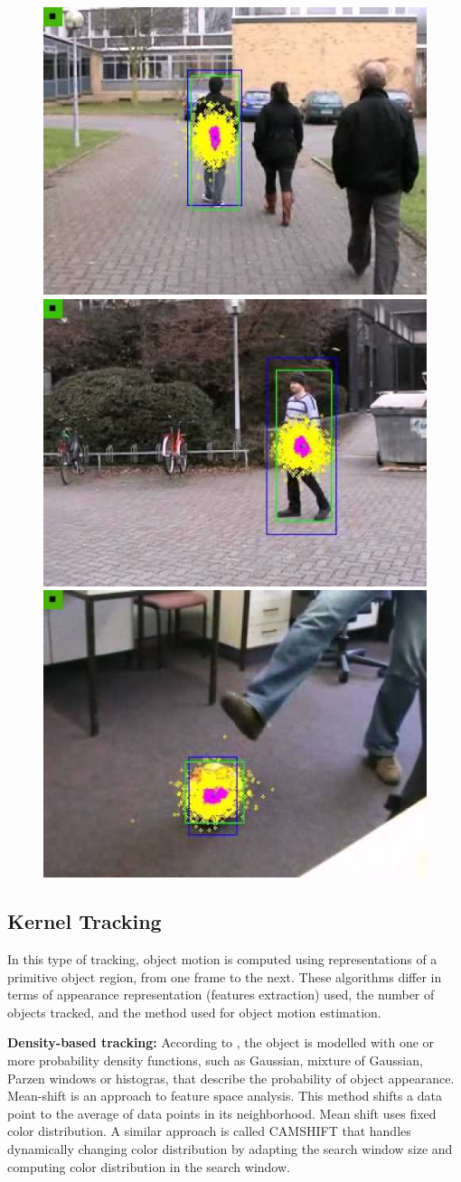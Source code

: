 \begin{figure}[t!!]
\centering
{
\includegraphics[width=0.32\linewidth]{Figures/particle_filter1.jpg}
\includegraphics[width=0.32\linewidth]{Figures/particle_filter2.jpg}
\includegraphics[width=0.32\linewidth]{Figures/particle_filter3.jpg}
}
\caption{\cite{Rittscher2000}}
\end{figure}


\subsection{Kernel Tracking}

In this type of tracking, object motion is computed using representations of a primitive object region, from one frame to the next. These algorithms differ in terms of appearance representation (features extraction) used, the number of objects tracked, and the method used for object motion estimation. 

\textbf{Density-based tracking:} According to \cite{Cheng1995}, the object is modelled with one or more probability density functions, such as Gaussian, mixture of Gaussian, Parzen windows or histogras, that describe the probability of object appearance. Mean-shift is an approach to feature space analysis. This method shifts a data point to the average of data points in its neighborhood. Mean shift uses fixed color distribution. A similar approach is called CAMSHIFT \cite{Exner2010} that handles dynamically changing color distribution by adapting the search window size and computing color distribution in the search window.

